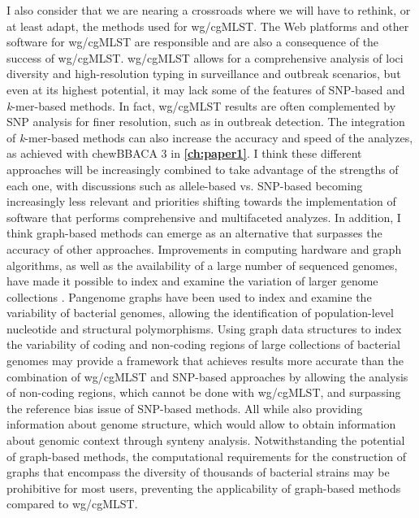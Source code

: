 I also consider that we are nearing a crossroads where we will have to rethink, or at least adapt, the methods used for \ac{wg/cgMLST}. The Web platforms and other software for \ac{wg/cgMLST} are responsible and are also a consequence of the success of \ac{wg/cgMLST}. \ac{wg/cgMLST} allows for a comprehensive analysis of loci diversity and high-resolution typing in surveillance and outbreak scenarios, but even at its highest potential, it may lack some of the features of \ac{SNP}-based and \textit{k}-mer-based methods. In fact, \ac{wg/cgMLST} results are often complemented by \ac{SNP} analysis for finer resolution, such as in outbreak detection. The integration of \textit{k}-mer-based methods can also increase the accuracy and speed of the analyzes, as achieved with chewBBACA 3 in \textbf{\autoref{ch:paper1}}. I think these different approaches will be increasingly combined to take advantage of the strengths of each one, with discussions such as allele-based vs. \ac{SNP}-based becoming increasingly less relevant and priorities shifting towards the implementation of software that performs comprehensive and multifaceted analyzes. In addition, I think graph-based methods can emerge as an alternative that surpasses the accuracy of other approaches. Improvements in computing hardware and graph algorithms, as well as the availability of a large number of sequenced genomes, have made it possible to index and examine the variation of larger genome collections \cite{holley_bifrost_2020, harling-lee_graph-based_2022, noll_pangraph_2023}. Pangenome graphs have been used to index and examine the variability of bacterial genomes, allowing the identification of population-level nucleotide and structural polymorphisms. Using graph data structures to index the variability of coding and non-coding regions of large collections of bacterial genomes may provide a framework that achieves results more accurate than the combination of \ac{wg/cgMLST} and \ac{SNP}-based approaches by allowing the analysis of non-coding regions, which cannot be done with \ac{wg/cgMLST}, and surpassing the reference bias issue of \ac{SNP}-based methods. All while also providing information about genome structure, which would allow to obtain information about genomic context through synteny analysis. Notwithstanding the potential of graph-based methods, the computational requirements for the construction of graphs that encompass the diversity of thousands of bacterial strains may be prohibitive for most users, preventing the applicability of graph-based methods compared to \ac{wg/cgMLST}.


